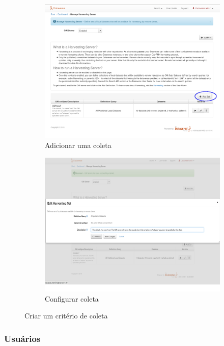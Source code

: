 \documentclass[12pt,hidelinks]{article}
\begin{document}
 \begin{figure}[ht]
\begin{subfigure}{.45\textwidth}
  \centering
  \includegraphics[width=.9\linewidth]{imagens/03.png}  
  \caption{Adicionar uma coleta}
  \label{img04.png}
\end{subfigure}
\begin{subfigure}{.45\textwidth}
  \centering
  \includegraphics[width=.9\linewidth]{imagens/05.png}  
  \caption{Configurar coleta}
  \label{img05.png}
\end{subfigure}
\caption{Criar um critério de coleta}
\label{img0405}
\end{figure}
 
\newpage
\subsubsection{Usuários}
\end{document}
